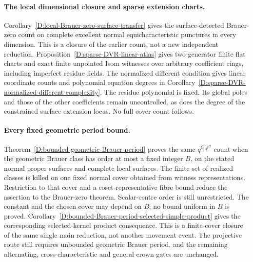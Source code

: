 \paragraph{The local dimensional closure and sparse extension charts.}
Corollary~\ref{D:local-Brauer-zero-surface-transfer} gives the
surface-detected Brauer-zero count on complete excellent normal
equicharacteristic punctures in every dimension. This is a closure
of the earlier count, not a new independent reduction.
Proposition~\ref{D:sparse-DVR-linear-atlas} gives two-generator
finite flat charts and exact finite unpointed Isom witnesses over
arbitrary coefficient rings, including imperfect residue fields.
The normalized different condition gives linear coordinate counts
and polynomial equation degrees in
Corollary~\ref{D:sparse-DVR-normalized-different-complexity}.
The residue polynomial is fixed. Its global poles and those of the
other coefficients remain uncontrolled, as does the degree of the
constrained surface-extension locus. No full cover count follows.


\paragraph{Every fixed geometric period bound.}
Theorem~\ref{D:bounded-geometric-Brauer-period} proves the same
$q^{C_Br^2}$ count when the geometric Brauer class has order at most
a fixed integer $B$, on the stated normal proper surfaces and
complete local surfaces. The finite set of realized classes is killed
on one fixed normal cover obtained from witness representations.
Restriction to that cover and a coset-representative fibre bound
reduce the assertion to the Brauer-zero theorem. Scalar-centre order
is still unrestricted. The constant and the chosen cover may depend
on $B$; no bound uniform in $B$ is proved.
Corollary~\ref{D:bounded-Brauer-period-selected-simple-product}
gives the corresponding selected-kernel product consequence.
This is a finite-cover closure of the same single main reduction,
not another movement event. The projective route still requires
unbounded geometric Brauer period, and the remaining alternating,
cross-characteristic and general-crown gates are unchanged.


